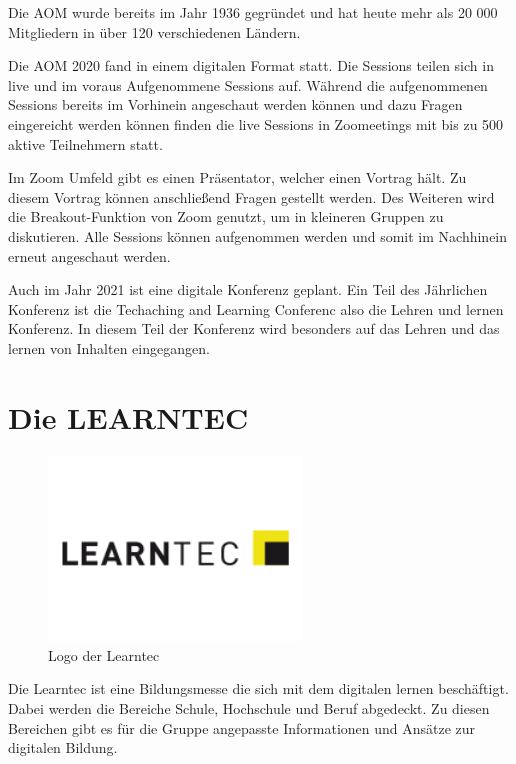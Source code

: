 Die \ac{AOM} wurde bereits im Jahr 1936 gegründet und hat heute mehr als 20 000 Mitgliedern in über 120 verschiedenen Ländern.\autocite{AOM_CMS.432021b} 

Die \ac{AOM} 2020 fand in einem digitalen Format statt. Die Sessions teilen sich in live und im voraus Aufgenommene Sessions auf. Während die aufgenommenen Sessions bereits im Vorhinein angeschaut werden können und dazu Fragen eingereicht werden können finden die live Sessions in Zoomeetings mit bis zu 500 aktive Teilnehmern statt. \autocite{AOM_CMS.432021} 

Im Zoom Umfeld gibt es einen Präsentator, welcher einen Vortrag hält. Zu diesem Vortrag können anschließend Fragen gestellt werden. Des Weiteren wird die Breakout-Funktion von Zoom genutzt, um in kleineren Gruppen zu diskutieren. Alle Sessions können aufgenommen werden und somit im Nachhinein erneut angeschaut werden. \autocite{AOM_CMS.432021c} 

Auch im Jahr 2021 ist eine digitale Konferenz geplant. \autocite{AOM_CMS.432021d}  Ein Teil des Jährlichen Konferenz ist die Techaching and Learning Conferenc also die Lehren und lernen Konferenz. In diesem Teil der Konferenz wird besonders auf das Lehren und das lernen von Inhalten eingegangen.


\section{Die LEARNTEC}
\begin{figure}[h]
    \centering
    \includegraphics[width=0.6\textwidth]{img/logolearn.png}
    \caption[Logo: Learntec]{Logo der Learntec}
    \label{fig: LOGO LEARNTEC}
\end{figure}
Die Learntec ist eine Bildungsmesse die sich mit dem digitalen lernen beschäftigt. Dabei werden die Bereiche Schule, Hochschule und Beruf abgedeckt. Zu diesen Bereichen gibt es für die Gruppe angepasste Informationen und Ansätze zur digitalen Bildung. \autocite{KarlsruherMesseundKongressGmbH.3232021} 

